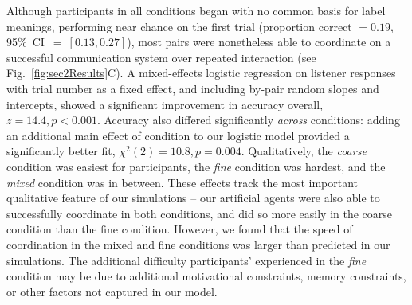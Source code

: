 Although participants in all conditions began with no common basis for label meanings, performing near chance on the first trial (proportion correct $= 0.19$, 95\%~CI~$=~[0.13, 0.27]$), most pairs were nonetheless able to coordinate on a successful communication system over repeated interaction (see Fig.\ \ref{fig:sec2Results}C). 
A mixed-effects logistic regression on listener responses with trial number as a fixed effect, and including by-pair random slopes and intercepts, showed a significant improvement in accuracy overall, $z = 14.4, p < 0.001$. 
Accuracy also differed significantly \emph{across} conditions: adding an additional main effect of condition to our logistic model provided a significantly better fit, $\chi^2(2) = 10.8, p = 0.004$. 
Qualitatively, the \emph{coarse} condition was easiest for participants, the \emph{fine} condition was hardest, and the \emph{mixed} condition was in between.
These effects track the most important qualitative feature of our simulations -- our artificial agents were also able to successfully coordinate in both conditions, and did so more easily in the coarse condition than the fine condition. 
However, we found that the speed of coordination in the mixed and fine conditions was larger than predicted in our simulations.
The additional difficulty participants' experienced in the \emph{fine} condition may be due to additional motivational constraints, memory constraints, or other factors not captured in our model.



